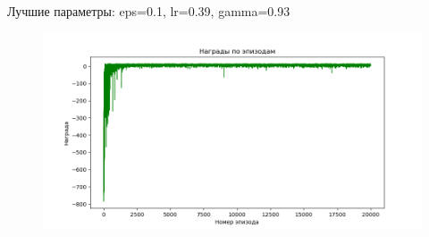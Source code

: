 \documentclass[a4paper]{article}
\begin{document}
  Лучшие параметры: eps=0.1, lr=0.39, gamma=0.93
  \begin{figure}[H]
    \includegraphics[scale=0.5]{rk24}
  \end{figure}
  \pagebreak
\end{document}
